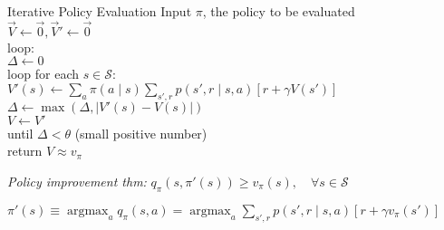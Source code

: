 \documentclass[twocolumn]{article}
\DeclareMathOperator*{\argmax}{argmax}
\begin{document}
\begin{mydef}{Iterative Policy Evaluation}{}
    Input $\pi$, the policy to be evaluated \\
    $\vec V \leftarrow \vec 0, \vec V' \leftarrow \vec 0$ \\
    loop: \\
        \hspace*{2em} $\Delta \leftarrow 0$ \\
        \hspace*{2em} loop for each $s \in \mathcal S$: \\
            \hspace*{4em}$V'(s) \leftarrow \sum_a \pi(a \mid s) \sum_{s', r} p(s', r \mid s, a) [r + \gamma V(s')]$ \\
            \hspace*{4em}$\Delta \leftarrow \max(\Delta, |V'(s) - V(s)|)$ \\
        \hspace*{2em}$V \leftarrow V'$ \\
    until $\Delta < \theta$ (small positive number) \\
    return $V \approx v_\pi$
\end{mydef}

\textit{Policy improvement thm:} $q_\pi(s, \pi'(s)) \geq v_\pi(s), \quad \forall s \in \mathcal S$

$\pi'(s) \equiv \argmax_a q_\pi(s,a) = \argmax_a \sum_{s', r} p(s',r \mid s,a) [r + \gamma v_\pi(s')]$
\end{document}
